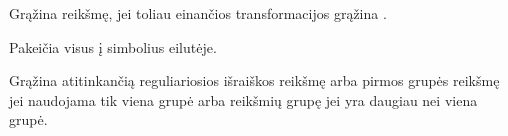 \documentclass[letterpaper,10pt,lithuanian]{sphinxmanual}
\begin{document}
\begin{fulllineitems}

\pysigstartsignatures
\pysigline
{}
\pysigstopsignatures{}

\begin{fulllineitems}
\label{\detokenize{formules:null}}
\pysigstartsignatures
\pysiglinewithargsret
{}
{}
{}
\pysigstopsignatures
\sphinxAtStartPar
Grąžina  reikšmę, jei toliau einančios transformacijos grąžina
.

\end{fulllineitems}


\begin{fulllineitems}
\label{\detokenize{formules:replace}}
\pysigstartsignatures
\pysiglinewithargsret
{}
{\sphinxparamcomma {}}
{}
\pysigstopsignatures
\sphinxAtStartPar
Pakeičia visus  į  simbolius eilutėje.

\end{fulllineitems}


\begin{fulllineitems}
\label{\detokenize{formules:re}}
\pysigstartsignatures
\pysiglinewithargsret
{}
{}
{}
\pysigstopsignatures
\sphinxAtStartPar
Grąžina atitinkančią reguliariosios išraiškos  reikšmę arba
pirmos grupės reikšmę jei naudojama tik viena grupė arba reikšmių grupę
jei  yra daugiau nei viena grupė.


\end{fulllineitems}
\end{fulllineitems}
\end{document}
